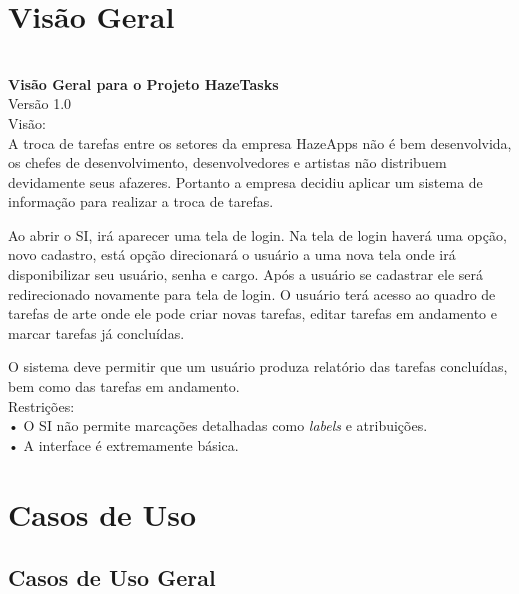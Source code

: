 \documentclass[a4paper, 12pt]{article}
\begin{document}
	\section{Visão Geral}


    \noindent \\\textbf{Visão Geral para o Projeto HazeTasks}\\
    
    \noindent Versão 1.0\\
    
    \noindent Visão:\\
    
    A troca de tarefas entre os setores da empresa HazeApps não é bem desenvolvida, os chefes de desenvolvimento, desenvolvedores e artistas não distribuem devidamente seus afazeres. Portanto a empresa decidiu aplicar um sistema de informação para realizar a troca de tarefas.

    Ao abrir o SI, irá aparecer uma tela de login. Na tela de login haverá uma opção, novo cadastro, está opção direcionará o usuário a uma nova tela onde irá disponibilizar seu usuário, senha e cargo. Após a usuário se cadastrar ele será redirecionado novamente para tela de login. O usuário terá acesso ao quadro de tarefas de arte onde ele pode criar novas tarefas, editar tarefas em andamento e marcar tarefas já concluídas. 
    
    O sistema deve permitir que um usuário produza relatório das tarefas concluídas, bem como das tarefas em andamento. \\

    \noindent Restrições:\\ 

    • O SI não permite marcações detalhadas como \textit{labels} e atribuições.\\
    
    • A interface é extremamente básica.\\
    
	\section{Casos de Uso}
	
	\subsection{Casos de Uso Geral}
	
\end{document}
